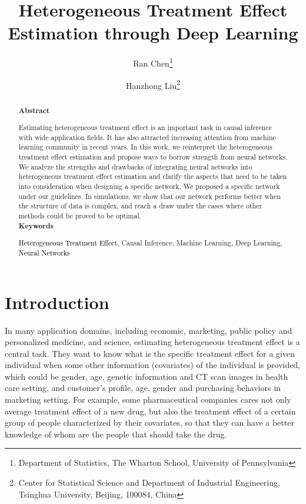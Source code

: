 \documentclass[11pt,paper=letter]{scrartcl}
\title{ Heterogeneous Treatment Effect Estimation through Deep Learning }
\author{ Ran Chen\thanks{ Department of Statistics, The Wharton School, University of Pennsylvania } 
\and 
Hanzhong Liu\thanks{Center for Statistical Science and Department of Industrial Engineering, Tsinghua University, Beijing, 100084, China} }
\newcommand\hz[1]{\textcolor{black}{#1}}
\begin{document}
	
\maketitle

\begin{abstract}
 \noindent	\textbf{Abstract}

  \noindent	 Estimating heterogeneous treatment effect is an important task in causal inference with wide application fields. It has also attracted increasing attention from machine learning community in recent years. In this work, we reinterpret the heterogeneous treatment effect estimation and propose ways to borrow strength from neural networks. We analyze the strengths and drawbacks of integrating neural networks into heterogeneous treatment effect estimation and clarify the aspects that need to be taken into consideration when designing a specific network. We proposed a specific network under our guidelines. In simulations, we show that our network performs better when the structure of data is complex, and reach a draw under the cases where other methods could be proved to be optimal.
\ \\

 \noindent \textbf{Keywords}

 \noindent  \hz{Heterogeneous Treatment Effect}, Causal Inference, Machine Learning, Deep Learning, \hz{Neural Networks}

\end{abstract}



\section{Introduction\label{intro}}

In many application domains, including economic, marketing, public policy and personalized medicine, and science, estimating heterogeneous treatment effect is a central task. They want to know what is the specific treatment effect for a given individual when some other information (covariates) of the individual is provided, which could be gender, age, genetic information and CT scan images in health care setting, and customer's profile, age, gender and purchasing behaviors in marketing setting. For example, some pharmaceutical companies cares not only average treatment effect of a new drug, but also the treatment effect of a certain group of people characterized by their covariates, so that they can have a better knowledge of whom are the people that should take the drug.
\end{document}
